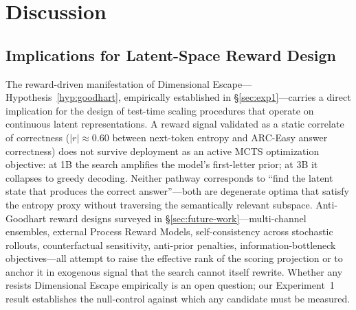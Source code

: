 \section{Discussion}

\subsection{Implications for Latent-Space Reward Design}\label{sec:discussion-implications}

The reward-driven manifestation of Dimensional Escape---Hypothesis~\ref{hyp:goodhart}, empirically established in §\ref{sec:exp1}---carries a direct implication for the design of test-time scaling procedures that operate on continuous latent representations. A reward signal validated as a static correlate of correctness ($|r| \approx 0.60$ between next-token entropy and ARC-Easy answer correctness) does not survive deployment as an active MCTS optimization objective: at 1B the search amplifies the model's first-letter prior; at 3B it collapses to greedy decoding. Neither pathway corresponds to ``find the latent state that produces the correct answer''---both are degenerate optima that satisfy the entropy proxy without traversing the semantically relevant subspace. Anti-Goodhart reward designs surveyed in §\ref{sec:future-work}---multi-channel ensembles, external Process Reward Models, self-consistency across stochastic rollouts, counterfactual sensitivity, anti-prior penalties, information-bottleneck objectives---all attempt to raise the effective rank of the scoring projection or to anchor it in exogenous signal that the search cannot itself rewrite. Whether any resists Dimensional Escape empirically is an open question; our Experiment~1 result establishes the null-control against which any candidate must be measured.

